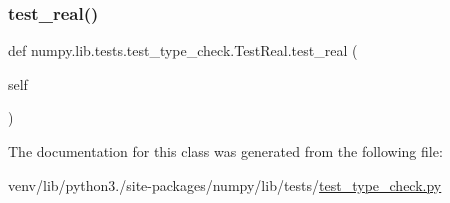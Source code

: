 \subsubsection{\texorpdfstring{test\+\_\+real()}{test\_real()}}
{\footnotesize\ttfamily def numpy.\+lib.\+tests.\+test\+\_\+type\+\_\+check.\+Test\+Real.\+test\+\_\+real (\begin{DoxyParamCaption}\item[{}]{self }\end{DoxyParamCaption})}



The documentation for this class was generated from the following file\+:\begin{DoxyCompactItemize}
\item 
venv/lib/python3./site-\/packages/numpy/lib/tests/\hyperlink{test__type__check_8py}{test\+\_\+type\+\_\+check.\+py}\end{DoxyCompactItemize}
